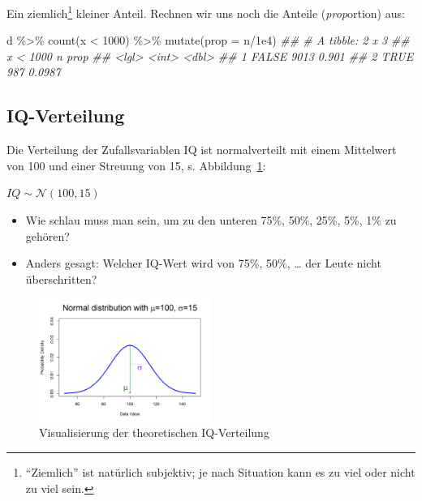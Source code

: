 \documentclass[
  a4paper,
  DIV=11]{scrreprt}
\newenvironment{Shaded}{\begin{snugshade}}{\end{snugshade}}
\newcommand{\AttributeTok}[1]{\textcolor[rgb]{0.40,0.45,0.13}{#1}}
\newcommand{\DecValTok}[1]{\textcolor[rgb]{0.68,0.00,0.00}{#1}}
\newcommand{\DocumentationTok}[1]{\textcolor[rgb]{0.37,0.37,0.37}{\textit{#1}}}
\newcommand{\FloatTok}[1]{\textcolor[rgb]{0.68,0.00,0.00}{#1}}
\newcommand{\FunctionTok}[1]{\textcolor[rgb]{0.28,0.35,0.67}{#1}}
\newcommand{\NormalTok}[1]{\textcolor[rgb]{0.00,0.23,0.31}{#1}}
\newcommand{\SpecialCharTok}[1]{\textcolor[rgb]{0.37,0.37,0.37}{#1}}
\providecommand{\tightlist}{%
  \setlength{\itemsep}{0pt}\setlength{\parskip}{0pt}}\usepackage{longtable,booktabs,array}
\theoremstyle{definition}
\theoremstyle{remark}
\begin{document}
Ein ziemlich\footnote{``Ziemlich'' ist natürlich subjektiv; je nach
  Situation kann es zu viel oder nicht zu viel sein.} kleiner Anteil.
Rechnen wir uns noch die Anteile (\emph{prop}ortion) aus:

\begin{Shaded}
\begin{Highlighting}[]
\NormalTok{d }\SpecialCharTok{\%\textgreater{}\%} 
  \FunctionTok{count}\NormalTok{(x }\SpecialCharTok{\textless{}} \DecValTok{1000}\NormalTok{) }\SpecialCharTok{\%\textgreater{}\%} 
  \FunctionTok{mutate}\NormalTok{(}\AttributeTok{prop =}\NormalTok{ n}\SpecialCharTok{/}\FloatTok{1e4}\NormalTok{)}
\DocumentationTok{\#\# \# A tibble: 2 x 3}
\DocumentationTok{\#\#   \textasciigrave{}x \textless{} 1000\textasciigrave{}     n   prop}
\DocumentationTok{\#\#   \textless{}lgl\textgreater{}      \textless{}int\textgreater{}  \textless{}dbl\textgreater{}}
\DocumentationTok{\#\# 1 FALSE       9013 0.901 }
\DocumentationTok{\#\# 2 TRUE         987 0.0987}
\end{Highlighting}
\end{Shaded}

\hypertarget{iq-verteilung}{%
\subsection{IQ-Verteilung}\label{iq-verteilung}}

Die Verteilung der Zufallsvariablen IQ ist normalverteilt mit einem
Mittelwert von 100 und einer Streuung von 15, s.
Abbildung~\ref{fig-norm-100-15}:

\(IQ \sim \mathcal{N}(100,15)\)

\begin{itemize}
\tightlist
\item
  Wie schlau muss man sein, um zu den unteren 75\%, 50\%, 25\%, 5\%, 1\%
  zu gehören?
\item
  Anders gesagt: Welcher IQ-Wert wird von 75\%, 50\%, \ldots{} der Leute
  nicht überschritten?
\end{itemize}

\begin{figure}

{\centering \includegraphics[width=0.5\textwidth,height=\textheight]{./img/norm-100-15.png}

}

\caption{\label{fig-norm-100-15}Visualisierung der theoretischen
IQ-Verteilung}

\end{figure}
\end{document}
